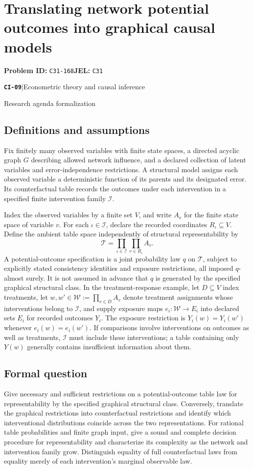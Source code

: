 \documentclass[11pt,a4paper]{article}
\newcommand{\entrymeta}[3]{{\sffamily\small\color{muted}\textbf{\texttt{#1}}\quad|\quad #2\par #3\par}}
\begin{document}
\section*{Translating network potential outcomes into graphical causal models}
\textbf{Problem ID:} \texttt{C31-168}\quad \textbf{JEL:} \texttt{C31}\par
\label{problem:OP-0488}
\label{beyond:CI-09}
\entrymeta{CI-09}{Econometric theory and causal inference}{Research agenda formalization}
\subsection*{Definitions and assumptions}
Fix finitely many observed variables with finite state spaces, a directed acyclic graph $G$ describing allowed network influence, and a declared collection of latent variables and error-independence restrictions. A structural model assigns each observed variable a deterministic function of its parents and its designated error. Its counterfactual table records the outcomes under each intervention in a specified finite intervention family $\mathcal I$.

Index the observed variables by a finite set $V$, and write $A_v$ for the finite state space of variable $v$. For each $\iota\in\mathcal I$, declare the recorded coordinates $R_\iota\subseteq V$. Define the ambient table space independently of structural representability by
\[
 \mathcal T=\prod_{\iota\in\mathcal I}\prod_{v\in R_\iota}A_v.
\]
A potential-outcome specification is a joint probability law $q$ on $\mathcal T$, subject to explicitly stated consistency identities and exposure restrictions, all imposed $q$-almost surely. It is not assumed in advance that $q$ is generated by the specified graphical structural class. In the treatment-response example, let $D\subseteq V$ index treatments, let $w,w'\in\mathcal W:=\prod_{v\in D}A_v$ denote treatment assignments whose interventions belong to $\mathcal I$, and supply exposure maps $e_i:\mathcal W\to E_i$ into declared sets $E_i$ for recorded outcomes $Y_i$. The exposure restriction is $Y_i(w)=Y_i(w')$ whenever $e_i(w)=e_i(w')$. If comparisons involve interventions on outcomes as well as treatments, $\mathcal I$ must include these interventions; a table containing only $Y(w)$ generally contains insufficient information about them.
\subsection*{Formal question}
Give necessary and sufficient restrictions on a potential-outcome table law for representability by the specified graphical structural class. Conversely, translate the graphical restrictions into counterfactual restrictions and identify which interventional distributions coincide across the two representations. For rational table probabilities and finite graph input, give a sound and complete decision procedure for representability and characterize its complexity as the network and intervention family grow. Distinguish equality of full counterfactual laws from equality merely of each intervention's marginal observable law.
\end{document}
